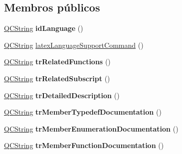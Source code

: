 \subsection*{Membros públicos}
\begin{DoxyCompactItemize}
\item 
\hypertarget{class_translator_slovene_a7de89df4aaf34700ff3db1d056a4f267}{\hyperlink{class_q_c_string}{Q\-C\-String} {\bfseries id\-Language} ()}\label{class_translator_slovene_a7de89df4aaf34700ff3db1d056a4f267}

\item 
\hyperlink{class_q_c_string}{Q\-C\-String} \hyperlink{class_translator_slovene_a0348bf1d3055ce6a48cf5f68f6fce2c1}{latex\-Language\-Support\-Command} ()
\item 
\hypertarget{class_translator_slovene_a577fc586e534023ef1529208518a994e}{\hyperlink{class_q_c_string}{Q\-C\-String} {\bfseries tr\-Related\-Functions} ()}\label{class_translator_slovene_a577fc586e534023ef1529208518a994e}

\item 
\hypertarget{class_translator_slovene_ab75e972b3134554de11b07bd64127b78}{\hyperlink{class_q_c_string}{Q\-C\-String} {\bfseries tr\-Related\-Subscript} ()}\label{class_translator_slovene_ab75e972b3134554de11b07bd64127b78}

\item 
\hypertarget{class_translator_slovene_abbd0ae4fd49dd1e88f99e03dd19d4e35}{\hyperlink{class_q_c_string}{Q\-C\-String} {\bfseries tr\-Detailed\-Description} ()}\label{class_translator_slovene_abbd0ae4fd49dd1e88f99e03dd19d4e35}

\item 
\hypertarget{class_translator_slovene_a95ba3c5f2554643a7dc0f3408c2b493d}{\hyperlink{class_q_c_string}{Q\-C\-String} {\bfseries tr\-Member\-Typedef\-Documentation} ()}\label{class_translator_slovene_a95ba3c5f2554643a7dc0f3408c2b493d}

\item 
\hypertarget{class_translator_slovene_acfa422f286e43d1d5c893475aca1e757}{\hyperlink{class_q_c_string}{Q\-C\-String} {\bfseries tr\-Member\-Enumeration\-Documentation} ()}\label{class_translator_slovene_acfa422f286e43d1d5c893475aca1e757}

\item 
\hypertarget{class_translator_slovene_aea34608536223538051d2155ff75e05e}{\hyperlink{class_q_c_string}{Q\-C\-String} {\bfseries tr\-Member\-Function\-Documentation} ()}\label{class_translator_slovene_aea34608536223538051d2155ff75e05e}


\end{DoxyCompactItemize}
